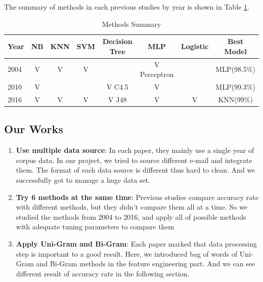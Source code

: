 The summary of methods in each previous studies by year is shown in Table \ref{method_summary}. 

\begin{table}[H]
	\centering
	\caption{Methods Summary}
	\label{method_summary}
	\begin{tabular}{lccccccc}
		\hline
		Year & NB & KNN   & SVM  & Decision Tree & MLP & Logistic & Best Model  \\ \hline
		2004 &  V &  V    & V     &  \quad  & V Perceptron & \quad& MLP(98.5\%) \\
		2010 &  V & \quad & \quad & V C4.5  & V            & \quad& MLP(99.3\%) \\ 
		2016 &  V &    V  & V     & V  J48  &   V & V      & KNN(99\%)  \\ \hline
	\end{tabular}
\end{table}





\subsection{Our Works}

\begin{enumerate}
	\item \textbf{Use multiple data source}: In each paper, they mainly use a single year of corpus data. In our project, we tried to source different e-mail and integrate them. The format of each data source is different thus hard to clean. And we successfully got to manage a huge data set. 

	\item \textbf{Try 6 methods at the same time}: Previous studies compare accuracy rate with different methods, but they didn't compare them all at a time. So we studied the methods from 2004 to 2016, and apply all of possible methods with adequate tuning parameters to compare them 

	\item \textbf{Apply Uni-Gram and Bi-Gram}: Each paper marked that data processing step is important to a good result. Here, we introduced bag of words of Uni-Gram and Bi-Gram methods in the feature engineering part. And we can see different result of accuracy rate in the following section.
\end{enumerate}
